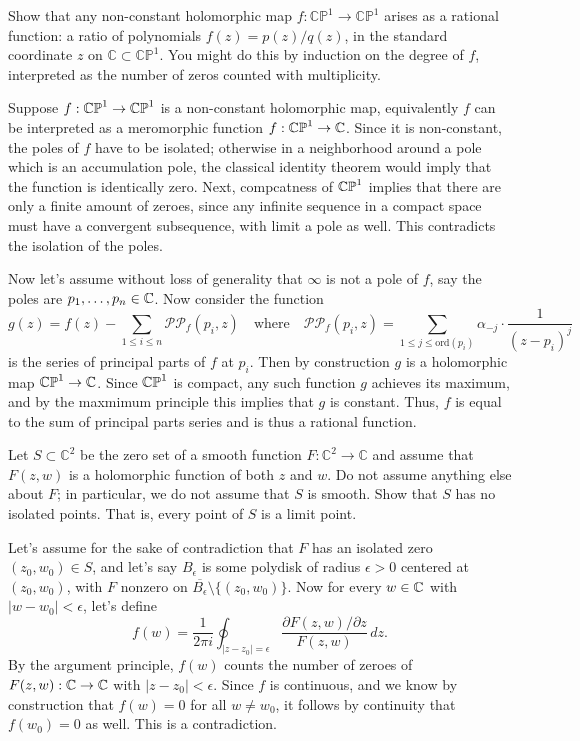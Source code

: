 \documentclass{pset}
\begin{document}
\begin{problem}{4}
Show that any non-constant holomorphic map $ f : \mathbb{CP}^1 \rightarrow \mathbb{CP}^1 $ arises as a rational function: a ratio of polynomials $ f(z) = p(z)/q(z) $, in the standard coordinate $ z $ on $ \mathbb{C} \subset \mathbb{CP}^1 $. You might do this by induction on the degree of $ f $, interpreted as the number of zeros counted with multiplicity.
\end{problem}

\begin{solution}
  Suppose $f : \mathbb{CP}^1 \to \mathbb{CP}^1$ is a non-constant holomorphic map, equivalently $f$ can be interpreted as a meromorphic function $f: \mathbb{CP}^1 \to \mathbb{C}$. Since it is non-constant, the poles of $f$ have to be isolated; otherwise in a neighborhood around a pole which is an accumulation pole, the classical identity theorem would imply that the function is identically zero. Next, compcatness of $\mathbb{CP}^1$ implies that there are only a finite amount of zeroes, since any infinite sequence in a compact space must have a convergent subsequence, with limit a pole as well. This contradicts the isolation of the poles.

  Now let's assume without loss of generality that $\infty$ is not a pole of $f$, say the poles are $p_1,\ldots, p_n\in \mathbb{C}$. Now consider the function
  \[
    g(z) = f(z) - \sum_{1\leq i\leq n} \mathcal{PP}_{f}(p_i, z) \quad\textrm{where}\quad \mathcal{PP}_{f}(p_i, z)=\sum_{1\leq j\leq \mathrm{ord}(p_i)} \alpha_{-j}\cdot \frac{1}{(z-p_i)^j}
  \]
  is the series of principal parts of $f$ at $p_i$. Then by construction $g$ is a holomorphic map $\mathbb{CP}^1 \to \mathbb{C}$. Since $\mathbb{CP}^1$ is compact, any such function $g$ achieves its maximum, and by the maxmimum principle this implies that $g$ is constant. Thus, $f$ is equal to the sum of principal parts series and is thus a rational function.
\end{solution}

\begin{problem}{5}
Let $ S \subset \mathbb{C}^2 $ be the zero set of a smooth function $ F : \mathbb{C}^2 \rightarrow \mathbb{C} $ and assume that $ F(z, w) $ is a holomorphic function of both $ z $ and $ w $. Do not assume anything else about $ F $; in particular, we do not assume that $ S $ is smooth. Show that $ S $ has no isolated points. That is, every point of $ S $ is a limit point.
\end{problem}

\begin{solution}
  Let's assume for the sake of contradiction that $F$ has an isolated zero $(z_0, w_0)\in S$, and let's say $B_\epsilon$ is some polydisk of radius $\epsilon>0$ centered at $(z_0, w_0)$, with $F$ nonzero on $\overline{B_\epsilon}\setminus \{(z_0, w_0)\}$. Now for every $w\in \mathbb{C}$ with $|w-w_0|<\epsilon$, let's define
  \[
    f(w) = \frac{1}{2\pi i}\oint_{|z-z_0|=\epsilon} \frac{\partial F(z, w)/ \partial z}{F(z, w)}\,dz.
  \]
  By the argument principle, $f(w)$ counts the number of zeroes of $F(z,w) : \mathbb{C} \to \mathbb{C}$ with $|z-z_0|<\epsilon$. Since $f$ is continuous, and we know by construction that $f(w)=0$ for all $w\neq w_0$, it follows by continuity that $f(w_0)=0$ as well. This is a contradiction.
\end{solution}
\end{document}
